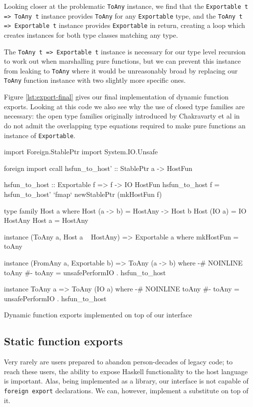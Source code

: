 \documentclass[preprint]{sigplanconf}
\begin{document}
Looking closer at the problematic \lstinline!ToAny! instance, we find that
the \lstinline!Exportable t => ToAny t! instance provides
\lstinline!ToAny! for any \lstinline!Exportable! type, and the
\lstinline!ToAny t => Exportable t! instance provides \lstinline!Exportable! in
return, creating a loop which creates instances for both type classes
matching any type.

The \lstinline!ToAny t => Exportable t! instance is necessary
for our type level recursion to work out when marshalling pure functions,
but we can prevent this instance from leaking to \lstinline!ToAny! where it
would be unreasonably broad by replacing our \lstinline!ToAny! function
instance with two slightly more specific ones.

Figure \ref{lst:export-final} gives our final implementation of dynamic
function exports.
Looking at this code we also see why the use of closed type families are
necessary: the open type families originally introduced by Chakravarty et al
in\ \cite{typefamilies} do not admit the overlapping type equations required
to make pure functions an instance of \lstinline!Exportable!.

\begin{listingfloat}
\begin{code}
  import Foreign.StablePtr
  import System.IO.Unsafe

  foreign import ccall
    hsfun_to_host' :: StablePtr a -> HostFun

  hsfun_to_host :: Exportable f => f -> IO HostFun
  hsfun_to_host f =
    hsfun_to_host' `fmap` newStablePtr (mkHostFun f)

  type family Host a where
    Host (a -> b) = HostAny -> Host b
    Host (IO a)   = IO HostAny
    Host a        = HostAny

  instance (ToAny a, Host a ~ HostAny) =>
            Exportable a where
    mkHostFun = toAny

  instance (FromAny a, Exportable b) =>
            ToAny (a -> b) where
    {-# NOINLINE toAny #-}
    toAny = unsafePerformIO . hsfun_to_host

  instance ToAny a => ToAny (IO a) where
    {-# NOINLINE toAny #-}
    toAny = unsafePerformIO . hsfun_to_host
\end{code}
\caption{Dynamic function exports implemented on top of our interface}
\label{lst:export-final}
\end{listingfloat}

\subsection{Static function exports}
\label{sec:exports}
Very rarely are users prepared to abandon person-decades of legacy code;
to reach these users, the ability to expose Haskell functionality to the host
language is important. Alas, being implemented as a library, our interface is
not capable of \lstinline!foreign export! declarations. We can, however,
implement a substitute on top of it.
\end{document}
